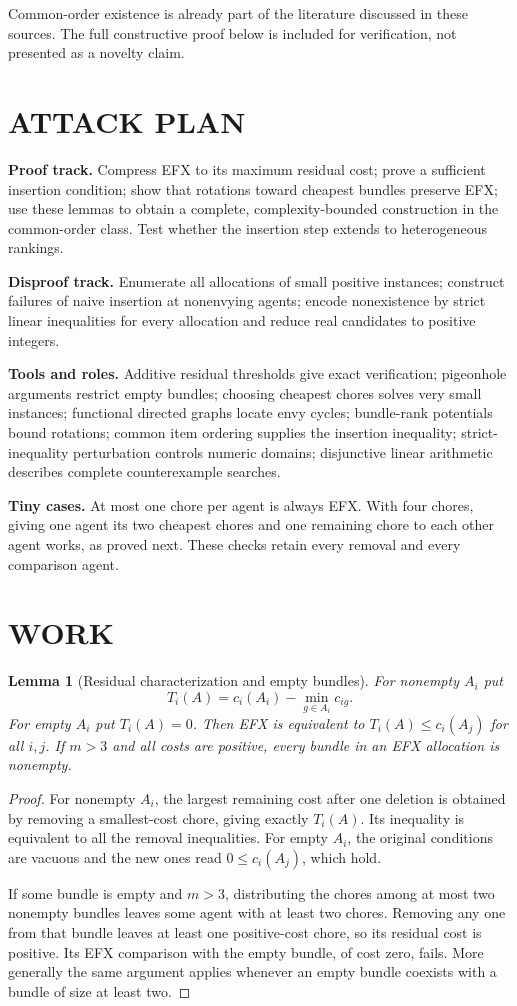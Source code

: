 \documentclass[11pt,a4paper]{article}
\newtheorem{lemma}[theorem]{Lemma}
\theoremstyle{definition}\newtheorem{definition}[theorem]{Definition}
\theoremstyle{remark}\newtheorem{remark}[theorem]{Remark}
\newcommand{\1}{\mathbf 1}
\begin{document}
Common-order existence is already part of the literature discussed in these sources. The full constructive proof below is included for verification, not presented as a novelty claim.

\section{ATTACK PLAN}
\textbf{Proof track.} Compress EFX to its maximum residual cost; prove a sufficient insertion condition; show that rotations toward cheapest bundles preserve EFX; use these lemmas to obtain a complete, complexity-bounded construction in the common-order class. Test whether the insertion step extends to heterogeneous rankings.

\textbf{Disproof track.} Enumerate all allocations of small positive instances; construct failures of naive insertion at nonenvying agents; encode nonexistence by strict linear inequalities for every allocation and reduce real candidates to positive integers.

\textbf{Tools and roles.} Additive residual thresholds give exact verification; pigeonhole arguments restrict empty bundles; choosing cheapest chores solves very small instances; functional directed graphs locate envy cycles; bundle-rank potentials bound rotations; common item ordering supplies the insertion inequality; strict-inequality perturbation controls numeric domains; disjunctive linear arithmetic describes complete counterexample searches.

\textbf{Tiny cases.} At most one chore per agent is always EFX. With four chores, giving one agent its two cheapest chores and one remaining chore to each other agent works, as proved next. These checks retain every removal and every comparison agent.

\section{WORK}
\begin{lemma}[Residual characterization and empty bundles]\label{lem:residual}
For nonempty $A_i$ put
\[
 T_i(A)=c_i(A_i)-\min_{g\in A_i}c_{ig}.
\]
For empty $A_i$ put $T_i(A)=0$. Then EFX is equivalent to
$T_i(A)\le c_i(A_j)$ for all $i,j$. If $m>3$ and all costs are positive, every bundle in an EFX allocation is nonempty.
\end{lemma}
\begin{proof}
For nonempty $A_i$, the largest remaining cost after one deletion is obtained by removing a smallest-cost chore, giving exactly $T_i(A)$. Its inequality is equivalent to all the removal inequalities. For empty $A_i$, the original conditions are vacuous and the new ones read $0\le c_i(A_j)$, which hold.

If some bundle is empty and $m>3$, distributing the chores among at most two nonempty bundles leaves some agent with at least two chores. Removing any one from that bundle leaves at least one positive-cost chore, so its residual cost is positive. Its EFX comparison with the empty bundle, of cost zero, fails. More generally the same argument applies whenever an empty bundle coexists with a bundle of size at least two.
\end{proof}
\end{document}
